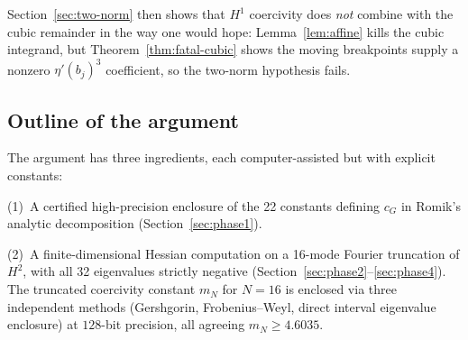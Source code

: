 \documentclass[11pt]{amsart}
\theoremstyle{plain}
\theoremstyle{definition}
\newcommand{\cG}{c_{G}}
\begin{document}
Section~\ref{sec:two-norm} then shows that $H^{1}$ coercivity does
\emph{not} combine with the cubic remainder in the way one would
hope: Lemma~\ref{lem:affine} kills the cubic integrand, but
Theorem~\ref{thm:fatal-cubic} shows the moving breakpoints supply a
nonzero $\eta'(b_{j})^{3}$ coefficient, so the two-norm hypothesis
fails.

\subsection*{Outline of the argument}

The argument has three ingredients, each computer-assisted but with
explicit constants:

(1)~A certified high-precision enclosure of the 22 constants defining
$\cG$ in Romik's analytic decomposition (Section~\ref{sec:phase1}).

(2)~A finite-dimensional Hessian computation on a 16-mode Fourier
truncation of $H^{2}$, with all 32 eigenvalues strictly negative
(Section~\ref{sec:phase2}--\ref{sec:phase4}).  The truncated
coercivity constant $m_N$ for $N=16$ is enclosed via three
independent methods (Gershgorin, Frobenius--Weyl, direct interval
eigenvalue enclosure) at $128$-bit precision, all agreeing
$m_N \geq 4.6035$.
\end{document}
